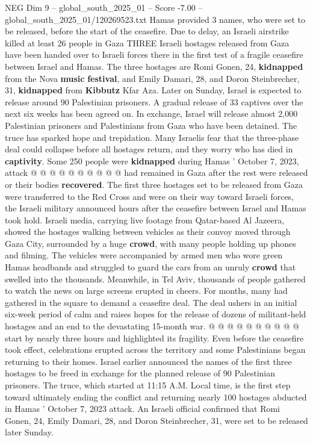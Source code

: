 \begin{textsample}{NEG Dim 9 – global\_south\_2025\_01 – Score -7.00 – global\_south\_2025\_01/120269523.txt}  \label{ex:f9_neg_136}
Hamas provided 3 names, who were set to be released, before the start of the ceasefire.
Due to delay, an Israeli airstrike killed at least 26 people in Gaza THREE Israeli hostages released from Gaza have been handed over to Israeli forces there in the first test of a fragile ceasefire between Israel and Hamas.
The three hostages are Romi Gonen, 24, \textbf{kidnapped} from the Nova \textbf{music} \textbf{festival}, and Emily Damari, 28, and Doron Steinbrecher, 31, \textbf{kidnapped} from \textbf{Kibbutz} Kfar Aza.
Later on Sunday, Israel is expected to release around 90 Palestinian prisoners.
A gradual release of 33 captives over the next six weeks has been agreed on.
In exchange, Israel will release almost 2,000 Palestinian prisoners and Palestinians from Gaza who have been detained.
The truce has sparked hope and trepidation.
Many Israelis fear that the three-phase deal could collapse before all hostages return, and they worry who has died in \textbf{captivity}.
Some 250 people were \textbf{kidnapped} during Hamas ' October 7, 2023, attack @ @ @ @ @ @ @ @ @ @ had remained in Gaza after the rest were released or their bodies \textbf{recovered}.
The first three hostages set to be released from Gaza were transferred to the Red Cross and were on their way toward Israeli forces, the Israeli military announced hours after the ceasefire between Israel and Hamas took hold.
Israeli media, carrying live footage from Qatar-based Al Jazeera, showed the hostages walking between vehicles as their convoy moved through Gaza City, surrounded by a huge \textbf{crowd}, with many people holding up phones and filming.
The vehicles were accompanied by armed men who wore green Hamas headbands and struggled to guard the cars from an unruly \textbf{crowd} that swelled into the thousands.
Meanwhile, in Tel Aviv, thousands of people gathered to watch the news on large screens erupted in cheers.
For months, many had gathered in the square to demand a ceasefire deal.
The deal ushers in an initial six-week period of calm and raises hopes for the release of dozens of militant-held hostages and an end to the devastating 15-month war. @ @ @ @ @ @ @ @ @ @ start by nearly three hours and highlighted its fragility.
Even before the ceasefire took effect, celebrations erupted across the territory and some Palestinians began returning to their homes.
Israel earlier announced the names of the first three hostages to be freed in exchange for the planned release of 90 Palestinian prisoners.
The truce, which started at 11:15 A.M.
Local time, is the first step toward ultimately ending the conflict and returning nearly 100 hostages abducted in Hamas ' October 7, 2023 attack.
An Israeli official confirmed that Romi Gonen, 24, Emily Damari, 28, and Doron Steinbrecher, 31, were set to be released later Sunday.

\end{textsample}
